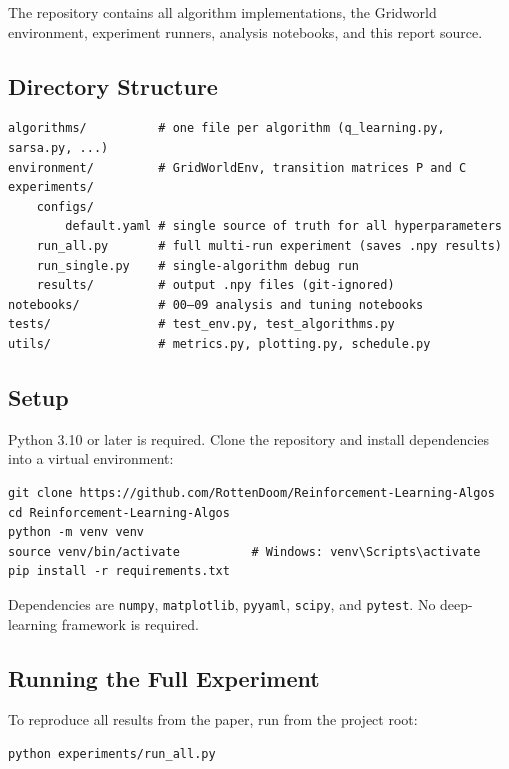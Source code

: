 \documentclass[11pt]{article}
\begin{document}
The repository contains all algorithm implementations, the Gridworld environment,
experiment runners, analysis notebooks, and this report source.

\subsection*{Directory Structure}

\begin{verbatim}
algorithms/          # one file per algorithm (q_learning.py, sarsa.py, ...)
environment/         # GridWorldEnv, transition matrices P and C
experiments/
    configs/
        default.yaml # single source of truth for all hyperparameters
    run_all.py       # full multi-run experiment (saves .npy results)
    run_single.py    # single-algorithm debug run
    results/         # output .npy files (git-ignored)
notebooks/           # 00–09 analysis and tuning notebooks
tests/               # test_env.py, test_algorithms.py
utils/               # metrics.py, plotting.py, schedule.py
\end{verbatim}

\subsection*{Setup}

Python 3.10 or later is required.  Clone the repository and install
dependencies into a virtual environment:

\begin{verbatim}
git clone https://github.com/RottenDoom/Reinforcement-Learning-Algos
cd Reinforcement-Learning-Algos
python -m venv venv
source venv/bin/activate          # Windows: venv\Scripts\activate
pip install -r requirements.txt
\end{verbatim}

Dependencies are \texttt{numpy}, \texttt{matplotlib}, \texttt{pyyaml},
\texttt{scipy}, and \texttt{pytest}.  No deep-learning framework is required.

\subsection*{Running the Full Experiment}

To reproduce all results from the paper, run from the project root:

\begin{verbatim}
python experiments/run_all.py
\end{verbatim}
\end{document}
